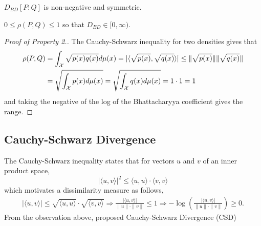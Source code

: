 \documentclass[11pt]{article}
\begin{document}
\begin{center}
\end{center}


\begin{Properties}
	\item $D_{BD}[P:Q]$ is non-negative and symmetric. 
	\item $0 \leq \rho(P,Q) \leq 1$ so that $D_{BD} \in [0,\infty)$.
\end{Properties}
\begin{proof}[Proof of Property 2.]
	The Cauchy-Schwarz inequality for two densities gives that 
	\begin{align*}
	\rho(P,Q) &= \int_{\cal{X}} \sqrt{p(x) q(x)} d\mu(x) = |\langle \sqrt{p(x)}, \sqrt{q(x)} \rangle| \leq  \| \sqrt{p(x)}\| \| \sqrt{q(x)}\|\\
	&= \sqrt{\int_{\cal{X}} p(x) d\mu(x)} = \sqrt{\int_{\cal{X}} q(x) d\mu(x)} = 1 \cdot 1 = 1
	\end{align*}
	and taking the negative of the log of the Bhattacharyya coefficient gives the range. 
\end{proof}

\subsection{Cauchy-Schwarz Divergence}\label{diss:CSD}

The Cauchy-Schwarz inequality states that for vectors $u$ and $v$ of an inner product space,
\begin{equation*}
\vert\langle u, v \rangle\vert^2 \leq \langle u,u \rangle \cdot \langle v, v \rangle
\end{equation*}
which motivates a dissimilarity measure as follows,
\begin{gather*}
\vert\langle u, v \rangle\vert  \leq \sqrt{\langle u,u \rangle} \cdot \sqrt{\langle v, v \rangle} \Rightarrow  \frac{\vert\langle u, v \rangle\vert}{ \|u\| \cdot  \|v\|} \leq 1 
\Rightarrow -\log \left( \frac{\vert\langle u, v \rangle\vert}{ \|u\| \cdot  \|v\|}  \right) \geq 0.
\end{gather*}
From the observation above, \cite{kampa_closed-form_2011-1} proposed Cauchy-Schwarz Divergence (CSD) 
\end{document}
